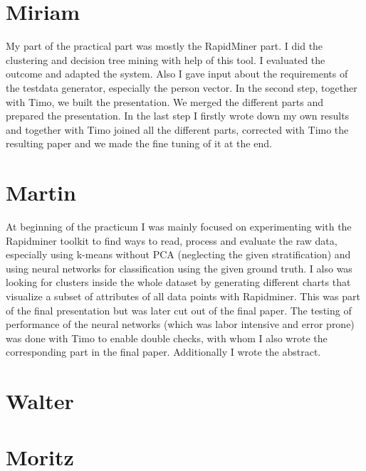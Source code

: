 \documentclass{article}
\begin{document}
	
\section{Miriam}
My part of the practical part was mostly the RapidMiner part. I did the clustering and decision tree  mining with help of this tool. I evaluated the outcome and adapted the system. Also I gave input about the requirements of the testdata generator, especially the person vector. In the second step, together with Timo, we built the presentation. We merged the different parts and prepared the presentation. In the last step I firstly wrote down my own results and together with Timo joined all the different parts, corrected with Timo the resulting paper and we made the fine tuning of it at the end.

\section{Martin}
At beginning of the practicum I was mainly focused on experimenting with the Rapidminer toolkit to find ways to read, process and evaluate the raw data, especially using k-means without PCA (neglecting the given stratification) and using neural networks for classification using the given ground truth. I also was looking for clusters inside the whole dataset by generating different charts that visualize a subset of attributes of all data points with Rapidminer. This was part of the final presentation but was later cut out of the final paper. The testing of performance of the neural networks (which was labor intensive and error prone) was done with Timo to enable double checks, with whom I also wrote the corresponding part in the final paper. Additionally I wrote the abstract.

\section{Walter}

\section{Moritz}
\end{document}
